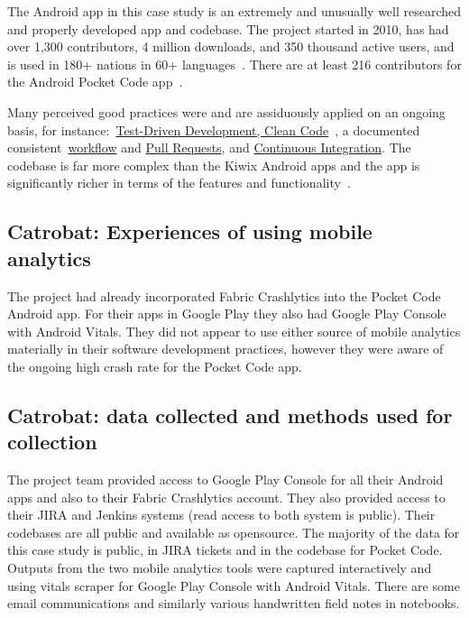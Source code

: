 
The Android app in this case study is an extremely and unusually well researched and properly developed app and codebase. The project started in 2010, has had over 1,300 contributors, 4 million downloads, and 350 thousand active users, and is used in 180+ nations in 60+ languages~\citep{catrobat_project}. There are at least 216 contributors for the Android Pocket Code app~\citep{github_catroid}.

Many perceived good practices were and are assiduously applied on an ongoing basis, for instance:~\href{https://github.com/Catrobat/Catroid}{Test-Driven Development, Clean Code}~\citep{catrobat_first_steps_into}, a documented consistent~\href{https://github.com/Catrobat/Catroid/wiki/Workflow}{workflow} and \href{https://github.com/Catrobat/Catroid/wiki/Creating-a-pull-request}{Pull Requests}, and \href{https://jenkins.catrob.at/job/Catroid/}{Continuous Integration}. The codebase is far more complex than the Kiwix Android apps and the app is significantly richer in terms of the features and functionality~\citep{mueller2019_pocketcode}.

\subsection{Catrobat: Experiences of using mobile analytics}
The project had already incorporated Fabric Crashlytics into the Pocket Code Android app. %
For their apps in Google Play they also had Google Play Console with Android Vitals. They did not appear to use either source of mobile analytics materially in their software development practices, however they were aware of the ongoing high crash rate for the Pocket Code app. %

\subsection{Catrobat: data collected and methods used for collection}
The project team provided access to Google Play Console for all their Android apps and also to their Fabric Crashlytics account. They also provided access to their JIRA and Jenkins systems (read access to both system is public). Their codebases are all public and available as opensource. The majority of the data for this case study is public, in JIRA tickets and in the codebase for Pocket Code. Outputs from the two mobile analytics tools were captured interactively and using vitals scraper for Google Play Console with Android Vitals. There are some email communications and similarly various handwritten field notes in notebooks.


